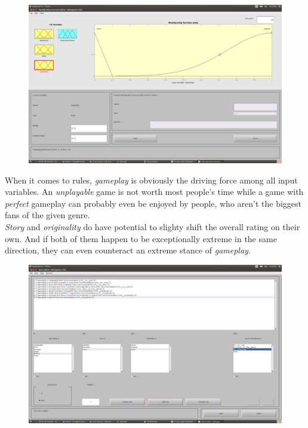 \documentclass[a4paper, 11pt]{article}
\begin{document}
\begin{figure}[ht]
\includegraphics[scale=0.15]{vg-mf-originality.jpg}
\end{figure}

When it comes to rules, \textit{gameplay} is obviously the driving force among all input variables. An \textit{unplayable} game is not worth most people's time while a game with \textit{perfect} gameplay can probably even be enjoyed by people, who aren't the biggest fans of the given genre. \\
\textit{Story} and \textit{originality} do have potential to slighty shift the overall rating on their own. And if both of them happen to be exceptionally extreme in the same direction, they can even counteract an extreme stance of \textit{gameplay}.

\begin{figure}[ht]
\includegraphics[scale=0.15]{vg-rules.jpg}
\end{figure}
\end{document}
